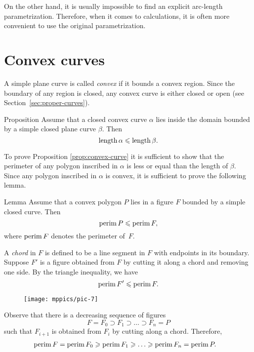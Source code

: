 On the other hand, it is usually impossible to find an explicit arc-length parametrization.
Therefore, when it comes to calculations, it is often more convenient to use the original parametrization.

\section{Convex curves}

A simple plane curve is called \emph{convex} if it bounds a convex region.
Since the boundary of any region is closed, any convex curve is either closed or open (see Section~\ref{sec:proper-curves}).

\begin{thm}{Proposition}\label{prop:convex-curve}
Assume that a closed convex curve $\alpha$ lies inside the domain bounded by a simple closed plane curve $\beta$.
Then
\[\mathop{\rm length}\nolimits\alpha\leqslant \mathop{\rm length}\nolimits\beta.\]
\end{thm}

To prove Proposition \ref{prop:convex-curve} it is sufficient to show that the perimeter of any polygon inscribed in $\alpha$ is less or equal than the length of $\beta$.
Since any polygon inscribed in $\alpha$ is convex, it is sufficient to prove the following lemma.

\begin{thm}{Lemma}\label{lem:perimeter}
Assume that a convex polygon $P$ lies in a figure $F$ bounded by a simple closed curve.
Then 
\[\mathop{\rm perim}\nolimits P\leqslant \mathop{\rm perim}\nolimits F,\]
where $\mathop{\rm perim}\nolimits F$ denotes the perimeter of~$F$.
\end{thm}

A \emph{chord} in $F$ is defined to be a line segment in $F$ with endpoints in its boundary.
Suppose $F'$ is a figure obtained from $F$ by cutting it along a chord and removing one side.
By the triangle inequality, we have
\[\mathop{\rm perim}\nolimits F'\leqslant \mathop{\rm perim}\nolimits F.\]

\begin{wrapfigure}{o}{24 mm}
\vskip-10mm
\centering
\texttt{[image: mppics/pic-7]}
\vskip3mm
\end{wrapfigure}

Observe that there is a decreasing sequence of figures 
\[F=F_0\supset F_1\supset\dots\supset F_n=P\]
such that $F_{i+1}$ is obtained from $F_{i}$ by cutting along a chord.
Therefore, 
\begin{align*}
\perim F=\perim F_0&\ge\perim F_1\ge\dots\ge\perim F_n=\perim P.
\end{align*}
\qedsf

